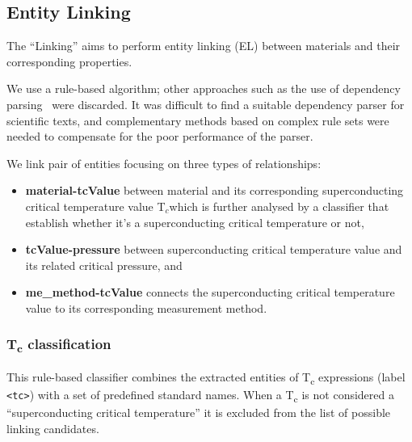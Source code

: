 \documentclass{article}
\newcommand{\tc}{T$_{c}$}
\begin{document}
\subsection{Entity Linking}
\label{subsubsec:linking}

The ``Linking'' aims to perform entity linking (EL) between materials and their corresponding properties.

We use a rule-based algorithm; other approaches such as the use of dependency parsing~\cite{yoshikawa:2017acl, Tiktinsky2020pyBARTES, swayamdipta:17, zhou-zhao-2019-head} were discarded. 
It was difficult to find a suitable dependency parser for scientific texts, and complementary methods based on complex rule sets were needed to compensate for the poor performance of the parser.

We link pair of entities focusing on three types of relationships: 
\begin{itemize}
    \item \textbf{material-tcValue} between material and its corresponding superconducting critical temperature value \tc which is further analysed by a classifier that establish whether it's a superconducting critical temperature or not, 
    \item \textbf{tcValue-pressure} between superconducting critical temperature value and its related critical pressure, and 
    \item \textbf{me\_method-tcValue} connects the superconducting critical temperature value to its corresponding measurement method.
\end{itemize}

\subsubsection{T\textsubscript{c} classification}
This rule-based classifier combines the extracted entities of T\textsubscript{c} expressions (label \texttt{<tc>}) with a set of predefined standard names. 
When a T\textsubscript{c} is not considered a ``superconducting critical temperature'' it is excluded from the list of possible linking candidates. 
\end{document}
